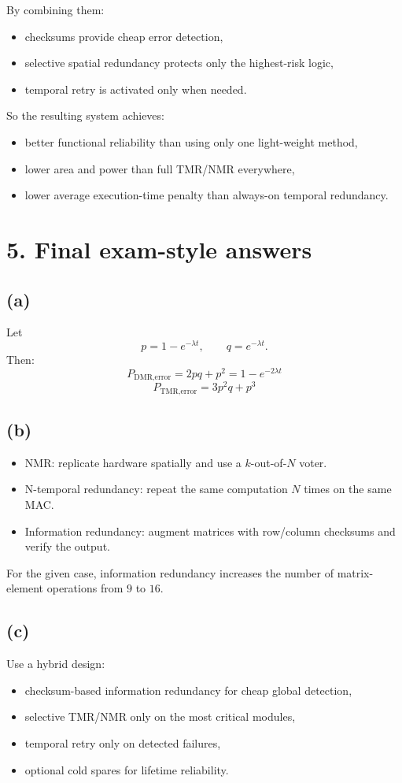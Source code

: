 \documentclass[11pt,a4paper]{article}
\begin{document}
By combining them:
\begin{itemize}
  \item checksums provide cheap error detection,
  \item selective spatial redundancy protects only the highest-risk logic,
  \item temporal retry is activated only when needed.
\end{itemize}

So the resulting system achieves:
\begin{itemize}
  \item better functional reliability than using only one light-weight method,
  \item lower area and power than full TMR/NMR everywhere,
  \item lower average execution-time penalty than always-on temporal redundancy.
\end{itemize}

\section*{5. Final exam-style answers}
\subsection*{(a)}
Let
\[
p=1-e^{-\lambda t},\qquad q=e^{-\lambda t}.
\]
Then:
\[
\boxed{P_{\text{DMR,error}}=2pq+p^2=1-e^{-2\lambda t}}
\]
\[
\boxed{P_{\text{TMR,error}}=3p^2q+p^3}
\]

\subsection*{(b)}
\begin{itemize}
  \item NMR: replicate hardware spatially and use a $k$-out-of-$N$ voter.
  \item N-temporal redundancy: repeat the same computation $N$ times on the same MAC.
  \item Information redundancy: augment matrices with row/column checksums and verify the output.
\end{itemize}
For the given case, information redundancy increases the number of matrix-element operations from $9$ to $16$.

\subsection*{(c)}
Use a hybrid design:
\begin{itemize}
  \item checksum-based information redundancy for cheap global detection,
  \item selective TMR/NMR only on the most critical modules,
  \item temporal retry only on detected failures,
  \item optional cold spares for lifetime reliability.
\end{itemize}
\end{document}
